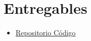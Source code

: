 \section{Entregables}

\begin{itemize}
	\item \href{https://github.com/smonsalve/Epi}{Repositorio Código}
\end{itemize}
